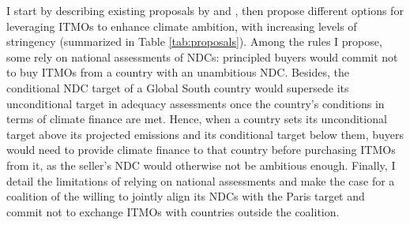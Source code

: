 \documentclass[12pt,english]{article}
\begin{document}


I start by describing existing proposals by \cite{michaelowa_additionality_2019} and \cite{la_hoz_theuer_when_2019}, then propose different options for leveraging ITMOs to enhance climate ambition, with increasing levels of stringency (summarized in Table \ref{tab:proposals}). Among the rules I propose, some rely on national assessments of NDCs: principled buyers would commit not to buy ITMOs from a country with an unambitious NDC. Besides, the conditional NDC target of a Global South country would supersede its unconditional target in adequacy assessments once the country's conditions in terms of climate finance are met. Hence, when a country sets its unconditional target above its projected emissions and its conditional target below them, buyers would need to provide climate finance to that country before purchasing ITMOs from it, as the seller's NDC would otherwise not be ambitious enough. Finally, I detail the limitations of relying on national assessments and make the case for a coalition of the willing to jointly align its NDCs with the Paris target and commit not to exchange ITMOs with countries outside the coalition. %
\end{document}
